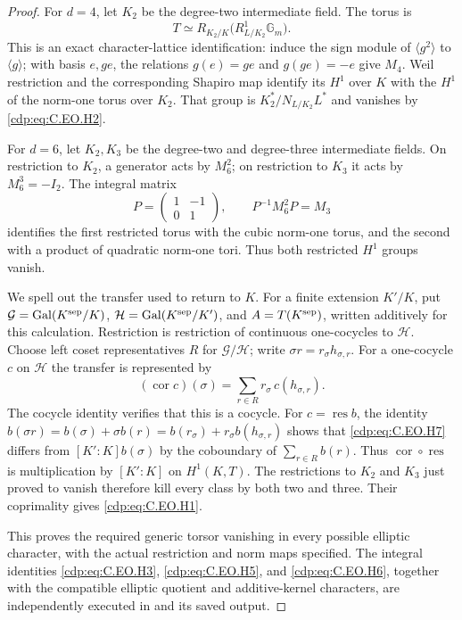 \begin{proof}
For $d=4$, let $K_2$ be the degree-two intermediate
field. The torus is
\[
        T\simeq R_{K_2/K}
                  \bigl(R^1_{L/K_2}\mathbb G_m\bigr).
                                                               \tag{C.EO.H5}\label{cdp:eq:C.EO.H5}
\]
This is an exact character-lattice identification:
induce the sign module of $\langle g^2\rangle$
to $\langle g\rangle$; with basis $e,ge$, the
relations $g(e)=ge$ and $g(ge)=-e$ give $M_4$.
Weil restriction and the corresponding Shapiro
map identify its $H^1$ over $K$ with the $H^1$
of the norm-one torus over $K_2$. That group is
$K_2^*/N_{L/K_2}L^*$ and vanishes by \eqref{cdp:eq:C.EO.H2}.

For $d=6$, let $K_2,K_3$ be the degree-two and
degree-three intermediate fields. On restriction
to $K_2$, a generator acts by $M_6^2$; on restriction
to $K_3$ it acts by $M_6^3=-I_2$. The integral matrix
\[
 P=\begin{pmatrix}1&-1\\0&1\end{pmatrix},\qquad
                  P^{-1}M_6^2P=M_3                  \tag{C.EO.H6}\label{cdp:eq:C.EO.H6}
\]
identifies the first restricted torus with the
cubic norm-one torus, and the second with a product
of quadratic norm-one tori. Thus both restricted
$H^1$ groups vanish.

We spell out the transfer used to return to $K$.
For a finite extension $K'/K$, put
$\mathcal G=\operatorname{Gal}(K^{\rm sep}/K)$,
$\mathcal H=\operatorname{Gal}(K^{\rm sep}/K')$,
and $A=T(K^{\rm sep})$, written additively for this
calculation. Restriction is restriction of continuous
one-cocycles to $\mathcal H$. Choose left coset
representatives $R$ for $\mathcal G/\mathcal H$;
write $\sigma r=r_\sigma h_{\sigma,r}$.
For a one-cocycle $c$ on $\mathcal H$ the transfer
is represented by
\[
       (\operatorname{cor}c)(\sigma)
            =\sum_{r\in R}r_\sigma\,
                         c(h_{\sigma,r}).             \tag{C.EO.H7}\label{cdp:eq:C.EO.H7}
\]
The cocycle identity verifies that this is a cocycle.
For $c=\operatorname{res}b$, the identity
$b(\sigma r)=b(\sigma)+\sigma b(r)
=b(r_\sigma)+r_\sigma b(h_{\sigma,r})$
shows that \eqref{cdp:eq:C.EO.H7} differs from
$[K':K]b(\sigma)$ by the coboundary of
$\sum_{r\in R}b(r)$. Thus
$\operatorname{cor}\circ\operatorname{res}$ is
multiplication by $[K':K]$ on $H^1(K,T)$.
The restrictions to $K_2$ and $K_3$ just proved
to vanish therefore kill every class by both
two and three. Their coprimality gives \eqref{cdp:eq:C.EO.H1}.

This proves the required generic torsor vanishing
in every possible elliptic character, with the
actual restriction and norm maps specified.
The integral identities \eqref{cdp:eq:C.EO.H3}, \eqref{cdp:eq:C.EO.H5},
and \eqref{cdp:eq:C.EO.H6}, together with the compatible
elliptic quotient and additive-kernel characters,
are independently executed in
 and its saved output.


\end{proof}
